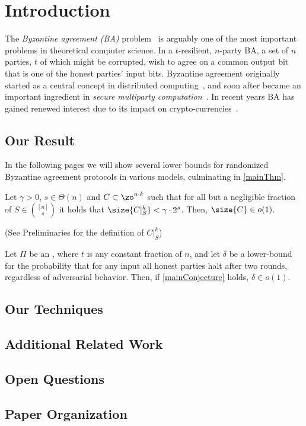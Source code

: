 \section{Introduction}\label{sec:intro}

The \emph{Byzantine agreement (BA)} problem~\cite{PSL80,LSP82} is arguably one of the most important problems in theoretical computer science. In a $t$-resilient, $n$-party BA, a set of $n$ parties, $t$ of which might be corrupted, wish to agree on a common output bit that is one of the honest parties' input bits. Byzantine agreement originally started as a central concept in distributed computing~\cite{PSL80,LSP82}, and soon after became an important ingredient in \emph{secure multiparty computation}~\cite{Yao82,GMW87}. In recent years BA has gained renewed interest due to its impact on crypto-currencies~\cite{Micali16,GHMVZ17,PS17}.



\subsection{Our Result}\label{sec:intro:ourResult}
In the following pages we will show several lower bounds for randomized Byzantine agreement protocols in various models, culminating in \cref{mainThm}.


\begin{conjecture}\label{mainConjecture}
	Let $\gamma > 0$, $s \in \Theta(n)$ and $C \subset \zo^{n\cdot k}$ such that for all but a negligible fraction of $S \in {\binom{[n]}{s}}$ it holds that $\size{C|^k_{S}} < \gamma \cdot 2^s$. Then, $\size{C} \in o(1)$.
\end{conjecture}
(See Preliminaries for the definition of $C|^k_{S}$)

\begin{theorem}\label{mainThm}
	Let $\Pi$ be an , where $t$ is any constant fraction of $n$, and let $\delta$ be a lower-bound for the probability that for any input all honest parties halt after two rounds, regardless of adversarial behavior. Then, if \cref{mainConjecture} holds, $\delta \in o(1)$. 
\end{theorem}

\subsection{Our Techniques}\label{sec:intro:technique}

\subsection{Additional Related Work}\label{sec:relatedWork}

\subsection{Open Questions}

\subsection*{Paper Organization}
